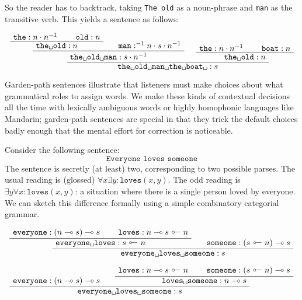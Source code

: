 \begin{fullwidth}
\begin{example}
So the reader has to backtrack, taking \texttt{The old} as a noun-phrase and \texttt{man} as the transitive verb. This yields a sentence as follows:

\[
\AxiomC{$\texttt{the} : n \cdot n^{-1}$}
\AxiomC{$\texttt{old} : n$}
\BinaryInfC{$\texttt{the\textvisiblespace old}: n$}
\AxiomC{$\texttt{man} : ^{-1}n \cdot s \cdot n^{-1}$}
\BinaryInfC{$\texttt{the\textvisiblespace old\textvisiblespace man}: s \cdot n^{-1}$}
\AxiomC{$\texttt{the} : n \cdot n^{-1}$}
\AxiomC{$\texttt{boat} : n$}
\BinaryInfC{$\texttt{the\textvisiblespace old}: n$}
\BinaryInfC{$\texttt{the\textvisiblespace old\textvisiblespace man\textvisiblespace the\textvisiblespace boat\textvisiblespace}: s$}
\DisplayProof
\]

Garden-path sentences illustrate that listeners must make choices about what grammatical roles to assign words. We make these kinds of contextual decisions all the time with lexically ambiguous words or highly homophonic languages like Mandarin; garden-path sentences are special in that they trick the default choices badly enough that the mental effort for correction is noticeable.
\end{example}

\begin{example}
Consider the following sentence:
\[\texttt{Everyone loves someone}\]
The sentence is secretly (at least) two, corresponding to two possible parses. The usual reading is (glossed) $\forall x \exists y : \texttt{loves}(x,y)$. The odd reading is $\exists y \forall x : \texttt{loves}(x,y)$: a situation where there is a single person loved by everyone. We can sketch this difference formally using a simple combinatory categorial grammar.

\[
\AxiomC{$\texttt{everyone} : (n \multimap s) \multimap s$}
\AxiomC{$\texttt{loves} : n \multimap s \ \rotatebox[origin=c]{180}{$\multimap$} \ n$}
\BinaryInfC{$\texttt{everyone\textvisiblespace loves} : s \ \rotatebox[origin=c]{180}{$\multimap$} \ n$}
\AxiomC{$\texttt{someone} : (s \ \rotatebox[origin=c]{180}{$\multimap$} \ n) \multimap s$}
\BinaryInfC{$\texttt{everyone\textvisiblespace loves\textvisiblespace someone} : s$}
\DisplayProof
\]

\[
\AxiomC{$\texttt{everyone} : (n \multimap s) \multimap s$}
\AxiomC{$\texttt{loves} : n \multimap s \ \rotatebox[origin=c]{180}{$\multimap$} \ n$}
\AxiomC{$\texttt{someone} : (s \ \rotatebox[origin=c]{180}{$\multimap$} \ n) \multimap s$}
\BinaryInfC{$\texttt{loves\textvisiblespace someone} : n \multimap s$}
\BinaryInfC{$\texttt{everyone\textvisiblespace loves\textvisiblespace someone} : s$}
\DisplayProof
\]


\end{example}
\end{fullwidth}
